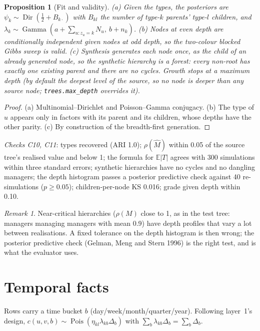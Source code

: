 \documentclass[11pt,a4paper]{article}
\newtheorem{proposition}{Proposition}
\theoremstyle{definition}
\theoremstyle{remark}
\newtheorem{remark}{Remark}
\newcommand{\E}{\mathbb{E}}
\newcommand{\Pois}{\operatorname{Pois}}
\newcommand{\Dir}{\operatorname{Dir}}
\newcommand{\Ga}{\operatorname{Gamma}}
\begin{document}
\begin{proposition}[Fit and validity]\label{prop:treefit}
(a) Given the types, the posteriors are $\psi_k\sim\Dir(\tfrac12+B_{k\cdot})$ with $B_{kl}$ the number of type-$k$ parents' type-$l$ children, and $\lambda_k\sim\Ga(a+\sum_{u:z_u=k}N_u,\ b+n_k)$. (b) Nodes at even depth are conditionally independent given nodes at odd depth, so the two-colour blocked Gibbs sweep is valid. (c) Synthesis generates each node once, as the child of an already generated node, so the synthetic hierarchy is a forest: every non-root has exactly one existing parent and there are no cycles. Growth stops at a maximum depth (by default the deepest level of the source, so no node is deeper than any source node; \texttt{trees.max\_depth} overrides it).
\end{proposition}
\begin{proof}
(a) Multinomial--Dirichlet and Poisson--Gamma conjugacy. (b) The type of $u$ appears only in factors with its parent and its children, whose depths have the other parity. (c) By construction of the breadth-first generation.
\end{proof}
\noindent\emph{Checks C10, C11}: types recovered (ARI 1.0); $\rho(\hat M)$ within 0.05 of the source tree's realised value and below 1; the formula for $\E|T|$ agrees with 300 simulations within three standard errors; synthetic hierarchies have no cycles and no dangling managers; the depth histogram passes a posterior predictive check against 40 re-simulations ($p\ge0.05$); children-per-node KS 0.016; grade given depth within 0.10.

\begin{remark}
Near-critical hierarchies ($\rho(M)$ close to 1, as in the test tree: managers managing managers with mean 0.9) have depth profiles that vary a lot between realisations. A fixed tolerance on the depth histogram is then wrong; the posterior predictive check (Gelman, Meng and Stern 1996) is the right test, and is what the evaluator uses.
\end{remark}

\section{Temporal facts}\label{sec:time}
Rows carry a time bucket $b$ (day/week/month/quarter/year). Following layer~1's design, $c(u,v,b)\sim\Pois(\eta_{kl}\lambda_{kb}\Delta_b)$ with $\sum_b\lambda_{kb}\Delta_b=\sum_b\Delta_b$.
\end{document}

